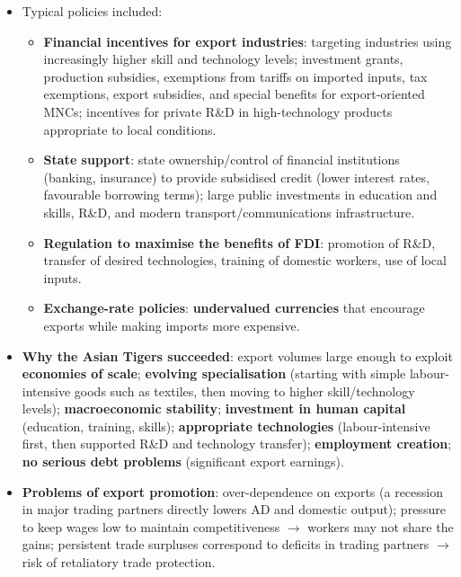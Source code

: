 \begin{itemize}
  \item Typical policies included:
  \begin{itemize}
    \item \textbf{Financial incentives for export industries}: targeting industries using increasingly higher skill and technology levels; investment grants, production subsidies, exemptions from tariffs on imported inputs, tax exemptions, export subsidies, and special benefits for export-oriented MNCs; incentives for private R\&D in high-technology products appropriate to local conditions.
    \item \textbf{State support}: state ownership/control of financial institutions (banking, insurance) to provide subsidised credit (lower interest rates, favourable borrowing terms); large public investments in education and skills, R\&D, and modern transport/communications infrastructure.
    \item \textbf{Regulation to maximise the benefits of FDI}: promotion of R\&D, transfer of desired technologies, training of domestic workers, use of local inputs.
    \item \textbf{Exchange-rate policies}: \textbf{undervalued currencies} that encourage exports while making imports more expensive.
  \end{itemize}
  \item \textbf{Why the Asian Tigers succeeded}: export volumes large enough to exploit \textbf{economies of scale}; \textbf{evolving specialisation} (starting with simple labour-intensive goods such as textiles, then moving to higher skill/technology levels); \textbf{macroeconomic stability}; \textbf{investment in human capital} (education, training, skills); \textbf{appropriate technologies} (labour-intensive first, then supported R\&D and technology transfer); \textbf{employment creation}; \textbf{no serious debt problems} (significant export earnings).
  \item \textbf{Problems of export promotion}: over-dependence on exports (a recession in major trading partners directly lowers AD and domestic output); pressure to keep wages low to maintain competitiveness $\to$ workers may not share the gains; persistent trade surpluses correspond to deficits in trading partners $\to$ risk of retaliatory trade protection.
\end{itemize}

